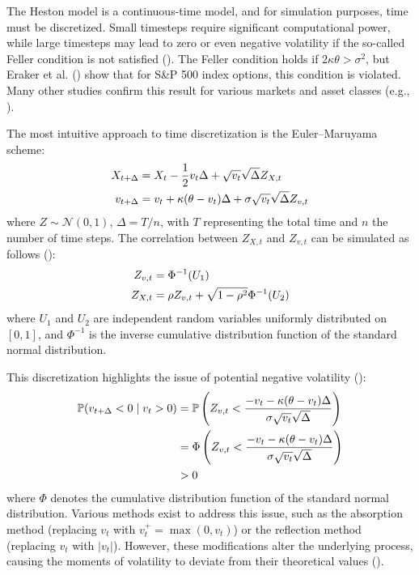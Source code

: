 The Heston model is a continuous-time model, and for simulation purposes, time must be discretized. Small timesteps require significant computational power, while large timesteps may lead to zero or even negative volatility if the so-called Feller condition is not satisfied (\cite{albrecherLittleHestonTrap2007}). The Feller condition holds if $2\kappa\theta > \sigma^2$, but Eraker et al. (\citeyear{erakerImpactJumpsVolatility2003}) show that for S\&P 500 index options, this condition is violated. Many other studies confirm this result for various markets and asset classes (e.g., \cite{changOptionPricingDouble2021,huPricingVolatilityJump2022}).

The most intuitive approach to time discretization is the Euler–Maruyama scheme:
\begin{align}
    X_{t+\Delta} &= X_t - \frac{1}{2}v_t\Delta + \sqrt{v_t}\sqrt{\Delta}Z_{X,t} \notag \\
    v_{t+\Delta} &= v_t + \kappa(\theta - v_t)\Delta + \sigma\sqrt{v_t}\sqrt{\Delta}Z_{v,t} \notag
\end{align}
where $Z \sim \mathcal{N}(0,1)$, $\Delta = T/n$, with $T$ representing the total time and $n$ the number of time steps. The correlation between $Z_{X,t}$ and $Z_{v,t}$ can be simulated as follows (\cite{andersenEfficientSimulationHeston2007}): %
\begin{align}
    Z_{v,t} &= \Phi^{-1}(U_1) \notag \\
    Z_{X,t} &= \rho Z_{v,t} + \sqrt{1-\rho^2}\Phi^{-1}(U_2) \notag
\end{align}
where $U_1$ and $U_2$ are independent random variables uniformly distributed on $[0,1]$, and $\Phi^{-1}$ is the inverse cumulative distribution function of the standard normal distribution.

This discretization highlights the issue of potential negative volatility (\cite{okhrinSimulatingCoxIngersoll2022}):
\begin{align}
    \mathbb{P}(v_{t+\Delta}<0 \mid v_t>0) &= \mathbb{P}\left(Z_{v,t} < \frac{-v_t-\kappa(\theta-v_t)\Delta}{\sigma\sqrt{v_t}\sqrt{\Delta}}\right) \notag \\
    &= \Phi\left(Z_{v,t} < \frac{-v_t-\kappa(\theta-v_t)\Delta}{\sigma\sqrt{v_t}\sqrt{\Delta}}\right) \notag \\
    &> 0 \notag
\end{align}
where $\Phi$ denotes the cumulative distribution function of the standard normal distribution. Various methods exist to address this issue, such as the absorption method (replacing $v_t$ with $v_t^+ = \max(0, v_t)$) or the reflection method (replacing $v_t$ with $\vert v_t\vert$). However, these modifications alter the underlying process, causing the moments of volatility to deviate from their theoretical values (\cite{okhrinSimulatingCoxIngersoll2022,tsoskounoglouSimulatingHestonModel2024}).

